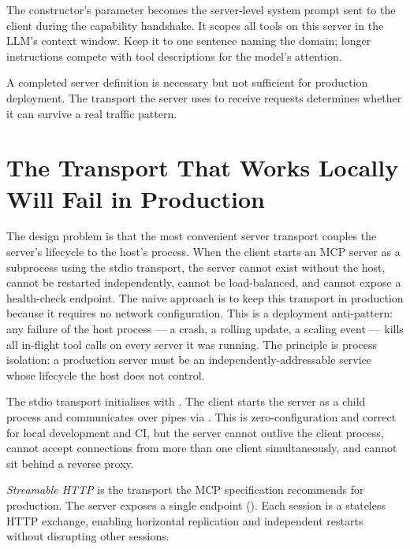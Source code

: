 \begin{notebox}
The  constructor's  parameter becomes
the server-level system prompt sent to the client during the
 capability handshake.
It scopes all tools on this server in the LLM's context window.
Keep it to one sentence naming the domain; longer instructions compete
with tool descriptions for the model's attention.
\end{notebox}

A completed server definition is necessary but not sufficient for
production deployment. The transport the server uses to receive requests
determines whether it can survive a real traffic pattern.

\section{The Transport That Works Locally Will Fail in Production}
\label{sec:mcp-transport}

The design problem is that the most convenient server transport couples
the server's lifecycle to the host's process. When the client starts an
MCP server as a subprocess using the stdio transport, the server cannot
exist without the host, cannot be restarted independently, cannot be
load-balanced, and cannot expose a health-check endpoint.
The naive approach is to keep this transport in production because it
requires no network configuration. This is a deployment anti-pattern:
any failure of the host process --- a crash, a rolling update, a
scaling event --- kills all in-flight tool calls on every server it
was running. The principle is process isolation: a production server
must be an independently-addressable service whose lifecycle the host
does not control.

The stdio transport initialises with .
The client starts the server as a child process and communicates over
pipes via . This is zero-configuration
and correct for local development and CI, but the server cannot
outlive the client process, cannot accept connections from more than
one client simultaneously, and cannot sit behind a reverse proxy.

\emph{Streamable HTTP} is the transport the MCP specification recommends
for production. The server exposes a single  endpoint
().
Each session is a stateless HTTP exchange, enabling horizontal
replication and independent restarts without disrupting other sessions.

